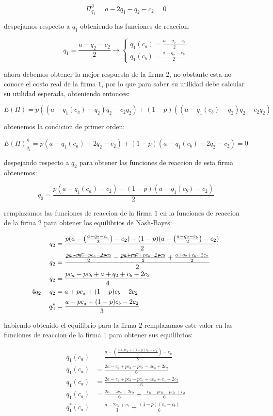 \documentclass[11pt]{article}
\begin{document}
\begin{flushleft}
    $$\Pi^\partial_{q_1} = a-2q_1-q_2-c_{2}=0$$

    despejamos respecto a $q_1$ obteniendo las funciones de reaccion:

    $$q_1=\frac{a-q_2-c_{2}}{2} \to \begin{cases}
                                       q_1(c_a)=\frac{a-q_2-c_{a}}{2} \\
                                       q_1(c_b)=\frac{a-q_2-c_{b}}{2}
                                    \end{cases}$$

    ahora debemos obtener la mejor respuesta de la firma $2$, no obstante esta no conoce el costo real de la firma $1$, por lo que para saber su utilidad debe calcular su utilidad esperada, obteniendo entonces:

    $$E(\Pi) = p((a-q_1(c_a)-q_2)q_2-c_2q_2)+(1-p)((a-q_1(c_b)-q_2)q_2-c_2q_2)$$

    obtenemos la condicion de primer orden:

    $$E(\Pi)^\partial_{q_2}=p(a-q_1(c_a)-2q_2-c_2)+(1-p)(a-q_1(c_b)-2q_2-c_2)=0$$

    despejando respecto a $q_2$ para obtener las funciones de reaccion de esta firma obtenemos:

    $$q_2=\frac{p(a-q_1(c_a)-c_2)+(1-p)(a-q_1(c_b)-c_2)}{2}$$

    remplazamos las funciones de reaccion de la firma $1$ en la funciones de reaccion de la firma $2$ para obtener los equilibrios de Nash-Bayes:

    \begin{align*}
        q_2&=\frac{p(a-\left(\frac{a-q_2-c_{a}}{2}\right)-c_2)+(1-p)(a-\left(\frac{a-q_2-c_{b}}{2}\right)-c_2)}{2}\\
        q_2&=\frac{\frac{\cancel{pa+pq_2}+pc_a-\cancel{2pc_2}}{2}-\frac{\cancel{pa+pq_2}+pc_b-\cancel{2pc_2}}{2}+\frac{a+q_2+c_b-2c_2}{2}}{2}\\
        q_2&=\frac{pc_a-pc_b+a+q_2+c_b-2c_2}{4}\\
        4q_2-q_2&=a+pc_a+(1-p)c_b-2c_2\\
        q_2^*&=\frac{a+pc_a+(1-p)c_b-2c_2}{3}
    \end{align*}

    habiendo obtenido el equilibrio para la firma $2$ remplazamos este valor en las funciones de reaccion de la firma $1$ para obtener sus equilibrios:

    \begin{align*}
        q_1(c_a)&=\frac{a-\left(\frac{a+pc_a+(1-p)c_b-2c_2}{3}\right)-c_{a}}{2}\\
        q_1(c_a)&=\frac{2a-c_b+pc_b-pc_a-3c_a+2c_2}{6}\\
        q_1(c_a)&=\frac{2a-c_b+pc_b-pc_a-4c_a+c_a+2c_2}{6}\\
        q_1(c_a)&=\frac{2a-4c_a+2c_2}{6}+\frac{-c_b+pc_b-pc_a+c_a}{6}\\
        q_1^*(c_a)&=\frac{a-2c_a+c_2}{3}+\frac{(1-p)(c_a-c_b)}{6}
    \end{align*}


\end{flushleft}
\end{document}
